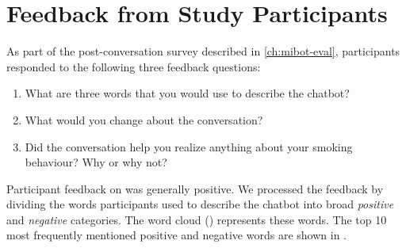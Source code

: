 \chapter{\sysname Feedback from Study Participants}
\label{app-feedback}

As part of the post-conversation survey described in \cref{ch:mibot-eval}, participants responded to the following three feedback questions:

\begin{tcolorbox}[breakable,
		colback=magenta!5!blue!10,        %
		colframe=magenta!60!blue!40,      %
		fonttitle=\bfseries, %
		fontupper=\small,
		title=Feedback Survey Questions]

	\begin{enumerate}
		\item What are three words that you would use to describe the chatbot?
		\item What would you change about the conversation?
		\item Did the conversation help you realize anything about your smoking behaviour? Why or why not?
	\end{enumerate}

\end{tcolorbox}



Participant feedback on \sysname was generally positive. We processed the feedback by dividing the words participants used to describe the chatbot into broad \textit{positive} and \textit{negative} categories. The word cloud () represents these words. The top 10 most frequently mentioned positive and negative words are shown in .


\renewcommand{\thetable}{J.\arabic{table}}
\setcounter{table}{0}

